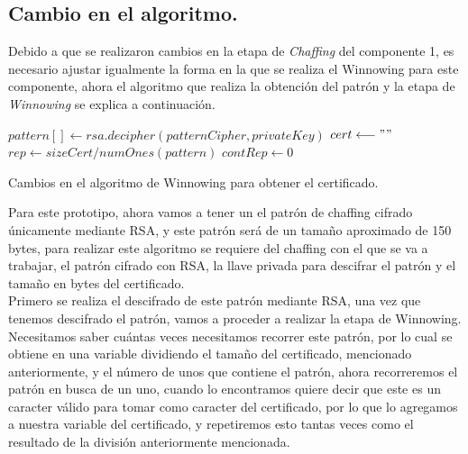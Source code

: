 \documentclass[12pt, a4paper, titlepage]{report}
\begin{document}
	        \subsection{Cambio en el algoritmo.}
                Debido a que se realizaron cambios en la etapa de \textit{Chaffing} del componente 1, es necesario ajustar igualmente la forma en la que se realiza el Winnowing para este componente, ahora el algoritmo que realiza la obtención del patrón y la etapa de \textit{Winnowing} se explica a continuación.
                
                \begin{algorithm}[H]
                    \SetAlgoLined
                    
                    $pattern[] \longleftarrow rsa.decipher(patternCipher, privateKey)$\;
                    $cert \longleftarrow " "$\;
                    $rep \longleftarrow sizeCert / numOnes(pattern)$\;
                    $contRep \longleftarrow 0$\; 
                    \caption{Cambios en el algoritmo de Winnowing para obtener el certificado.}
                \end{algorithm}
                
                Para este prototipo, ahora vamos a tener un el patrón de chaffing cifrado únicamente mediante RSA, y este patrón será de un tamaño aproximado de 150 bytes, para realizar este algoritmo se requiere del chaffing con el que se va a trabajar, el patrón cifrado con RSA, la llave privada para descifrar el patrón y el tamaño en bytes del certificado.\\
                
                Primero se realiza el descifrado de este patrón mediante RSA, una vez que tenemos descifrado el patrón, vamos a proceder a realizar la etapa de Winnowing. Necesitamos saber cuántas veces necesitamos recorrer este patrón, por lo cual se obtiene en una variable dividiendo el tamaño del certificado, mencionado anteriormente, y el número de unos que contiene el patrón, ahora recorreremos el patrón en busca de un uno, cuando lo encontramos quiere decir que este es un caracter válido para tomar como caracter del certificado, por lo que lo agregamos a nuestra variable del certificado, y repetiremos esto tantas veces como el resultado de la división anteriormente mencionada.\\
                
\end{document}
